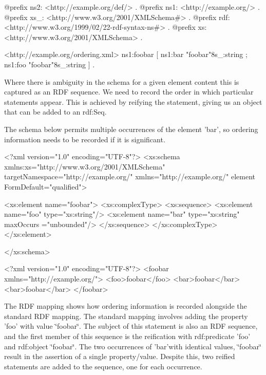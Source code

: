 \begin{DoxyCodeInclude}
@prefix ns2:     <http://example.org/def/> .
@prefix ns1:     <http://example.org/> .
@prefix xs_:     <http://www.w3.org/2001/XMLSchema#> .
@prefix rdf:     <http://www.w3.org/1999/02/22-rdf-syntax-ns#> .
@prefix xs:      <http://www.w3.org/2001/XMLSchema> .

<http://example.org/ordering.xml>
      ns1:foobar
              [ ns1:bar "foobar"^^xs_:string ;
                ns1:foo "foobar"^^xs_:string
              ] .
\end{DoxyCodeInclude}


Where there is ambiguity in the schema for a given element content this is captured as an RDF sequence. We need to record the order in which particular statements appear. This is achieved by reifying the statement, giving us an object that can be added to an rdf:Seq.

The schema below permits multiple occurrences of the element 'bar', so ordering information needs to be recorded if it is significant.


\begin{DoxyCodeInclude}
<?xml version="1.0" encoding="UTF-8"?>
<xs:schema xmlns:xs="http://www.w3.org/2001/XMLSchema" 
        targetNamespace="http://example.org/" xmlns="http://example.org/" element
      FormDefault="qualified">

        <xs:element name="foobar">
                <xs:complexType>
                        <xs:sequence>
                                <xs:element name="foo" type="xs:string"/>
                                <xs:element name="bar" type="xs:string" maxOccurs
      ="unbounded"/>
                        </xs:sequence>
                </xs:complexType>
        </xs:element>

</xs:schema>
\end{DoxyCodeInclude}
 
\begin{DoxyCodeInclude}
<?xml version="1.0" encoding="UTF-8"?>
<foobar xmlns="http://example.org/">
        <foo>foobar</foo>
        <bar>foobar</bar>
        <bar>foobar</bar>
</foobar>

\end{DoxyCodeInclude}


The RDF mapping shows how ordering information is recorded alongside the standard RDF mapping. The standard mapping involves adding the property 'foo' with value \char`\"{}foobar\char`\"{}. The subject of this statement is also an RDF sequence, and the first member of this sequence is the reification with rdf:predicate 'foo' and rdf:object \char`\"{}foobar\char`\"{}. The two occurrences of 'bar'with identical values, \char`\"{}foobar\char`\"{} result in the assertion of a single property/value. Despite this, two reified statements are added to the sequence, one for each occurrence.


